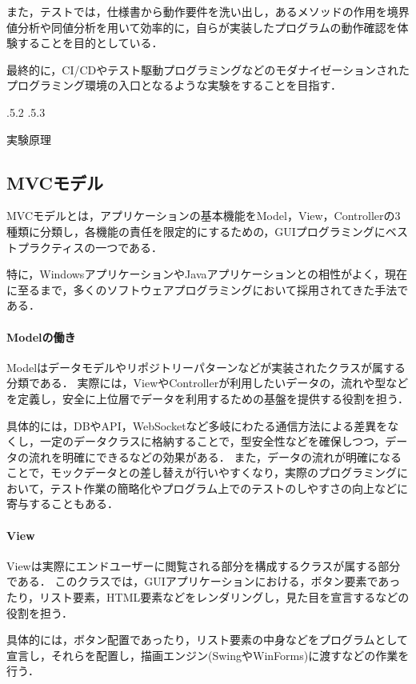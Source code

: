 \documentclass[platex,dvipdfmx,12pt]{jsarticle}
\makeatletter
\renewcommand{\section}{%
\clearpage
\@startsection{section}{1}{\z@}%
{\Cvs \@plus.5\Cdp \@minus.2\Cdp}%
{.5\Cvs \@plus.3\Cdp}%
{\normalfont\LARGE\headfont\raggedright}}%
\makeatother
\begin{document}
また，テストでは，仕様書から動作要件を洗い出し，あるメソッドの作用を境界値分析や同値分析を用いて効率的に，自らが実装したプログラムの動作確認を体験することを目的としている．

最終的に，CI/CDやテスト駆動プログラミングなどのモダナイゼーションされたプログラミング環境の入口となるような実験をすることを目指す．


\section{実験原理}
\subsection{MVCモデル}
MVCモデルとは，アプリケーションの基本機能をModel，View，Controllerの3種類に分類し，各機能の責任を限定的にするための，GUIプログラミングにベストプラクティスの一つである．

特に，WindowsアプリケーションやJavaアプリケーションとの相性がよく，現在に至るまで，多くのソフトウェアプログラミングにおいて採用されてきた手法である．

\paragraph{Modelの働き}
Modelはデータモデルやリポジトリーパターンなどが実装されたクラスが属する分類である．
実際には，ViewやControllerが利用したいデータの，流れや型などを定義し，安全に上位層でデータを利用するための基盤を提供する役割を担う．

具体的には，DBやAPI，WebSocketなど多岐にわたる通信方法による差異をなくし，一定のデータクラスに格納することで，型安全性などを確保しつつ，データの流れを明確にできるなどの効果がある．
また，データの流れが明確になることで，モックデータとの差し替えが行いやすくなり，実際のプログラミングにおいて，テスト作業の簡略化やプログラム上でのテストのしやすさの向上などに寄与することもある．

\paragraph{View}
Viewは実際にエンドユーザーに閲覧される部分を構成するクラスが属する部分である．
このクラスでは，GUIアプリケーションにおける，ボタン要素であったり，リスト要素，HTML要素などをレンダリングし，見た目を宣言するなどの役割を担う．

具体的には，ボタン配置であったり，リスト要素の中身などをプログラムとして宣言し，それらを配置し，描画エンジン(SwingやWinForms)に渡すなどの作業を行う．
\end{document}
